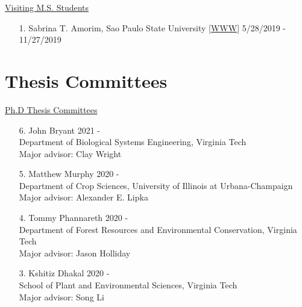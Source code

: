 \documentclass[margin,line,10pt]{res}
\begin{document}
\begin{resume}
\begin{flushleft}
\hspace{0.2cm} \underline{Visiting M.S. Students}
\end{flushleft}
\begin{enumerate}
\item [1.] Sabrina T. Amorim, Sao Paulo State University [\textcolor{blue}{\href{https://sabrinaam.github.io/}{WWW}}]  \hfill 5/28/2019 - 11/27/2019
\end{enumerate}


\vspace{0.5cm}
\section{\sc Thesis Committees}

\begin{flushleft}
\hspace{0.2cm} \underline{Ph.D Thesis Committees}
\end{flushleft}
\begin{enumerate}

 \item [6.] John Bryant \hfill 2021 - \\
  Department of Biological Systems Engineering, Virginia Tech \\
  Major advisor: Clay Wright

  \vspace{0.3cm}

  \item [5.] Matthew Murphy \hfill 2020 - \\
  Department of Crop Sciences, University of Illinois at Urbana-Champaign \\
  Major advisor: Alexander E. Lipka 

  \vspace{0.3cm}
  
  \item [4.] Tommy Phannareth \hfill 2020 - \\
  Department of Forest Resources and Environmental Conservation, Virginia Tech \\
  Major advisor: Jason Holliday

  \vspace{0.3cm}
  
  \item [3.] Kshitiz Dhakal \hfill 2020 - \\
  School of Plant and Environmental Sciences,  Virginia Tech \\
  Major advisor: Song Li


\end{enumerate}
\end{resume}
\end{document}

